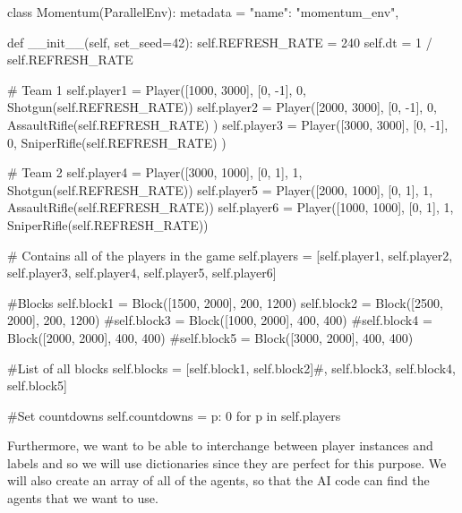 \begin{mpy}
class Momentum(ParallelEnv):
    metadata = {
        "name": "momentum_env",
    }

    def __init__(self, set_seed=42):
        self.REFRESH_RATE = 240
        self.dt = 1 / self.REFRESH_RATE

        # Team 1
        self.player1 = Player([1000, 3000], [0, -1], 0, Shotgun(self.REFRESH_RATE))
        self.player2 = Player([2000, 3000], [0, -1], 0, AssaultRifle(self.REFRESH_RATE)
        )
        self.player3 = Player([3000, 3000], [0, -1], 0, SniperRifle(self.REFRESH_RATE)
        )

        # Team 2
        self.player4 = Player([3000, 1000], [0, 1], 1, Shotgun(self.REFRESH_RATE))
        self.player5 = Player([2000, 1000], [0, 1], 1, AssaultRifle(self.REFRESH_RATE))
        self.player6 = Player([1000, 1000], [0, 1], 1, SniperRifle(self.REFRESH_RATE))

        # Contains all of the players in the game
        self.players = [self.player1, self.player2, self.player3, self.player4, self.player5, self.player6]

        #Blocks
        self.block1 = Block([1500, 2000], 200, 1200)
        self.block2 = Block([2500, 2000], 200, 1200)
        #self.block3 = Block([1000, 2000], 400, 400)
        #self.block4 = Block([2000, 2000], 400, 400)
        #self.block5 = Block([3000, 2000], 400, 400)

        #List of all blocks
        self.blocks = [self.block1, self.block2]#, self.block3, self.block4, self.block5]

        #Set countdowns
        self.countdowns = {p: 0 for p in self.players}
\end{mpy}

Furthermore, we want to be able to interchange between player instances and labels and so we will use dictionaries since they are perfect for this purpose. We will also create an array of all of the agents, so that the AI code can find the agents that we want to use.


